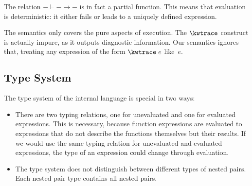 \documentclass{scrartcl}
\newcommand{\extrace}[1]{\kwtrace \; #1}
\begin{document}
The relation ${−} ⊢ {−} → {−}$ is in fact a partial function. This means
that evaluation is deterministic: it either fails or leads to a uniquely
defined expression.

The semantics only covers the pure aspects of execution. The $\kwtrace$
construct is actually impure, as it outputs diagnostic information. Our
semantics ignores that, treating any expression of the form
$\extrace{e}$ like~$e$.

\subsection{Type System}

The type system of the internal language is special in two ways:
\begin{itemize}

\item

There are two typing relations, one for unevaluated and one for
evaluated expressions. This is necessary, because function expressions
are evaluated to expressions that do not describe the functions
themselves but their results. If we would use the same typing relation
for unevaluated and evaluated expressions, the type of an expression
could change through evaluation.

\item

The type system does not distinguish between different types of nested
pairs. Each nested pair type contains all nested pairs.

\end{itemize}
\end{document}
